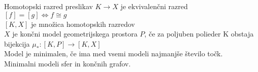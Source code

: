 \documentclass[70]{beamer}
\begin{document}
\begin{frame}
    Homotopski razred preslikav $K \rightarrow X$ je ekvivalenčni razred \\
    $ [f] = [g] \Leftrightarrow f \cong  g$
    \pause \\
    $[K,X]$ je množica homotopskih razredov    \\ \pause
    $X$ je končni model geometrijskega prostora $P$, če za poljuben polieder K
    obstaja bijekcija $\mu_*:[K,P] \rightarrow [K,X]$\pause \\
    Model je minimalen, če ima med vsemi modeli najmanjše število točk.\\ \pause
    Minimalni modeli sfer in končnih grafov.
\end{frame}
\end{document}
